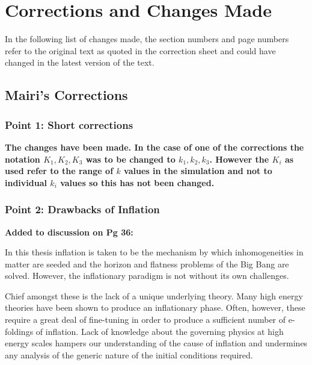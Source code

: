 \chapter{Corrections and Changes Made}
\label{ch:corr}

In the following list of changes made, the section numbers and page numbers refer to the original
text as quoted in the correction sheet and could have changed in the latest version of the text.


\section{Mairi's Corrections}

\subsection{Point 1: Short corrections}
\textbf{The changes have been made. 
In the case of one of the corrections the notation $K_1,K_2,K_3$ was to be changed to
$k_1,k_2,k_3$. However the $K_i$ as used refer to the range of $k$ values in the simulation and
not to individual $k_i$ values so this has not been changed.}

\subsection{Point 2: Drawbacks of Inflation}
\textbf{Added to discussion on Pg 36:}

In this thesis inflation is taken to be the mechanism by which inhomogeneities in matter are seeded
and the horizon and flatness problems of the Big Bang are solved. However, the inflationary
paradigm is not without its own challenges.

Chief amongst these is the lack of a unique underlying theory. Many high energy theories have been
shown to produce an inflationary phase. Often, however, these require a great deal of fine-tuning
in order to produce a sufficient number of e-foldings of inflation. Lack of knowledge about the
governing physics at high energy scales hampers our understanding of the cause of inflation and
undermines any analysis of the generic nature of the initial conditions required.

